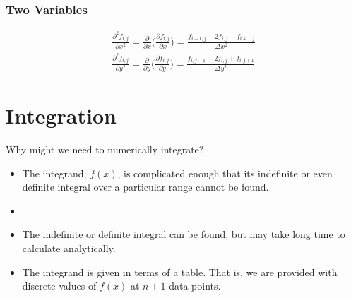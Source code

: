 \documentclass[12pt]{exam}
\begin{document}
\subsubsection*{Two Variables}
\begin{align*}
\frac{\partial^2 f_{i,j}}{\partial x^2} = \frac{\partial}{\partial x}\bigl(\frac{\partial f_{i,j}}{\partial x}\bigr) =
\frac{f_{i-1,j} - 2f_{i,j} + f_{i+1,j}}{\Delta x^2} \\
%
\frac{\partial^2 f_{i,j}}{\partial y^2} = \frac{\partial}{\partial y}\bigl(\frac{\partial f_{i,j}}{\partial y}\bigr) =
\frac{f_{i,j-1} - 2f_{i,j} + f_{i,j+1}}{\Delta y^2}
\end{align*}
\begin{center}
\end{center}


\vspace*{-2em}
\section*{Integration}
Why might we need to numerically integrate?
\begin{itemize}
\ifprintanswers
\item The integrand, $f(x)$, is complicated enough that its
indefinite or even definite integral over a particular range cannot
be found.
\else
\item
\fi
\item The indefinite or definite integral can be found, but may take
long time to calculate analytically.
\item The integrand is given in terms of a table. That is, we are
provided with discrete values of $f(x)$ at $n+1$ data points.
\end{itemize}
\end{document}
